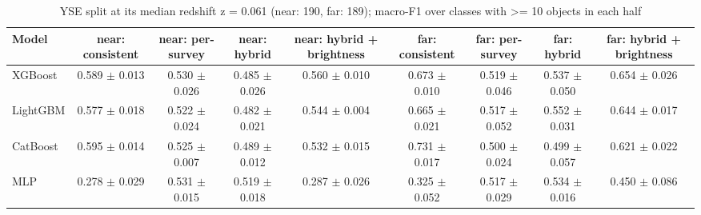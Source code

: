 \begin{table}
\centering
\caption{YSE split at its median redshift z = 0.061 (near: 190, far: 189); macro-F1 over classes with >= 10 objects in each half}
\begin{tabular}{lcccccccc}
\hline
Model & near: consistent & near: per-survey & near: hybrid & near: hybrid + brightness & far: consistent & far: per-survey & far: hybrid & far: hybrid + brightness \\
\hline
XGBoost & 0.589 $\pm$ 0.013 & 0.530 $\pm$ 0.026 & 0.485 $\pm$ 0.026 & 0.560 $\pm$ 0.010 & 0.673 $\pm$ 0.010 & 0.519 $\pm$ 0.046 & 0.537 $\pm$ 0.050 & 0.654 $\pm$ 0.026 \\
LightGBM & 0.577 $\pm$ 0.018 & 0.522 $\pm$ 0.024 & 0.482 $\pm$ 0.021 & 0.544 $\pm$ 0.004 & 0.665 $\pm$ 0.021 & 0.517 $\pm$ 0.052 & 0.552 $\pm$ 0.031 & 0.644 $\pm$ 0.017 \\
CatBoost & 0.595 $\pm$ 0.014 & 0.525 $\pm$ 0.007 & 0.489 $\pm$ 0.012 & 0.532 $\pm$ 0.015 & 0.731 $\pm$ 0.017 & 0.500 $\pm$ 0.024 & 0.499 $\pm$ 0.057 & 0.621 $\pm$ 0.022 \\
MLP & 0.278 $\pm$ 0.029 & 0.531 $\pm$ 0.015 & 0.519 $\pm$ 0.018 & 0.287 $\pm$ 0.026 & 0.325 $\pm$ 0.052 & 0.517 $\pm$ 0.029 & 0.534 $\pm$ 0.016 & 0.450 $\pm$ 0.086 \\
\hline
\end{tabular}
\end{table}
